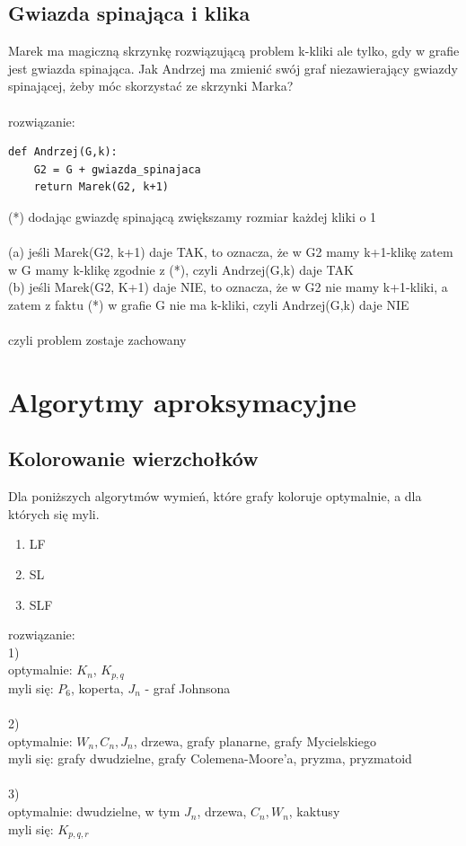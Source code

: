 \documentclass{article}
\begin{document}
\subsection*{Gwiazda spinająca i klika}
Marek ma magiczną skrzynkę rozwiązującą problem k-kliki ale tylko, gdy w grafie jest gwiazda spinająca. 
Jak Andrzej ma zmienić swój graf niezawierający gwiazdy spinającej, żeby móc skorzystać ze skrzynki Marka? \\\\
rozwiązanie:\\
\begin{lstlisting}
def Andrzej(G,k):
	G2 = G + gwiazda_spinajaca
	return Marek(G2, k+1)
\end{lstlisting}
(*) dodając gwiazdę spinającą zwiększamy rozmiar każdej kliki o 1 \\\\
(a) jeśli Marek(G2, k+1) daje TAK, to oznacza, że w G2 mamy k+1-klikę zatem w G mamy k-klikę zgodnie z (*), czyli Andrzej(G,k) daje TAK\\
(b) jeśli Marek(G2, K+1) daje NIE, to oznacza, że w G2 nie mamy k+1-kliki, a zatem z faktu (*) w grafie G nie ma k-kliki, czyli
Andrzej(G,k) daje NIE \\\\
czyli problem zostaje zachowany


\section{Algorytmy aproksymacyjne}
\subsection*{Kolorowanie wierzchołków}
Dla poniższych algorytmów wymień, które grafy koloruje optymalnie, a dla których się myli.
\begin{enumerate}
	\item LF
	\item SL
	\item SLF
\end{enumerate}
rozwiązanie: \\
1)\\
optymalnie: $K_n$, $K_{p,q}$ \\
myli się: $P_6$, koperta,  $J_n$ - graf Johnsona \\\\
2)\\
optymalnie: $W_n, C_n, J_n$, drzewa, grafy planarne, grafy Mycielskiego \\
myli się: grafy dwudzielne, grafy Colemena-Moore'a, pryzma,  pryzmatoid \\\\
3)\\
optymalnie: dwudzielne, w tym $J_n$, drzewa, $C_n, W_n$, kaktusy \\
myli się: $K_{p,q,r}$
\end{document}
